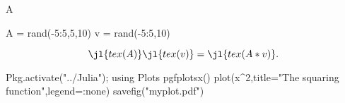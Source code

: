 \documentclass{article}
\newcommand\jltex[1]{\jl{tex(#1)}}
\begin{document}
A

\begin{jlcode}
	A = rand(-5:5,5,10)
	v = rand(-5:5,10)
\end{jlcode}

\[
	\jltex{A} \jltex{v} = \jltex{A*v}.
\]

\begin{jlcode}
	Pkg.activate("../Julia");
	using Plots
	pgfplotsx()
	plot(x^2,title="The squaring function",legend=:none)
	savefig("myplot.pdf")
\end{jlcode}

\begin{center}
\end{center}

\end{document}
